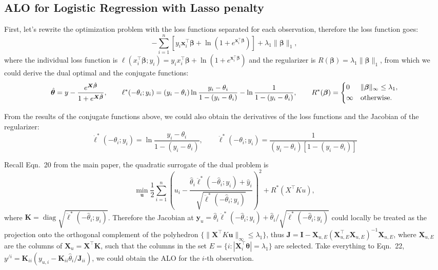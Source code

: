 \documentclass[11pt]{article}
\newcommand{\bu}{\bm{u}}
\newcommand{\bx}{\bm{x}}
\newcommand{\by}{\bm{y}}
\newcommand{\bI}{\bm{I}}
\newcommand{\bJ}{\bm{J}}
\newcommand{\bK}{\bm{K}}
\newcommand{\bX}{\bm{X}}
\newcommand{\bbeta}{\bm{\beta}}
\newcommand{\btheta}{\bm{\theta}}
\DeclareMathOperator{\diag}{diag}
\newcommand{\refthm}[2]{#1~#2}
\begin{document}
\subsection{ALO for Logistic Regression with Lasso penalty}
First, let's rewrite the optimization problem with the loss functions separated for each observation, therefore the loss function goes: \[-\sum_{i=1}^n\left[y_{i}\bx_{i}^{\top}\bbeta+\ln\left(1+e^{\bx_{i}^{\top}\bbeta}\right)\right]+\lambda_{1}\|\bbeta\|_{1},\]
where the individual loss function is $\ell(x_{i}^{\top}\bbeta ;y_{i}) = y_{i}x_{i}^{\top}\bbeta+\ln(1+e^{\bx_{i}^{\top}\bbeta})$ and the regularizer is $R(\bbeta) = \lambda_{1}\|\bbeta\|_{1}$, from which we could derive the dual optimal and the conjugate functions: \[\hat{\btheta} = y - \frac{e^{\bX\hat{\bbeta}}}{1+e^{\bX\hat{\bbeta}}},\qquad \ell^{*}(-\theta_{i};y_{i})=(y_{i}-\theta_{i})\ln\frac{y_{i}-\theta_{i}}{1-(y_{i}-\theta_{i})}-\ln\frac{1}{1-(y_{i}-\theta_{i})},\qquad R^{*}(\bbeta) =\begin{dcases}
0 & \|\bbeta\|_{\infty} \leq \lambda_{1},\\
\infty & \text{otherwise}.\\
\end{dcases}\]

From the results of the conjugate functions above, we could also obtain the derivatives of the loss functions and the Jacobian of the regularizer: \[\dot{\ell}^{*}(-\theta_{i};y_{i}) = \ln \frac{y_{i}-\theta_{i}}{1-(y_{i}-\theta_{i})},\qquad \ddot{\ell}^{*}(-\theta_{i};y_{i}) = \frac{1}{(y_{i}-\theta_{i})[1-(y_{i}-\theta_{i})]}\]

Recall \refthm{Eqn.}{20} from the main paper, the quadratic surrogate of the dual problem is \[\min\limits_{\bu} \frac{1}{2}\sum_{i=1}^n\left(u_{i}-\frac{\hat{\theta}_{i}\ddot{\ell}^{*}(-\hat{\theta}_{i};y_{i})+\hat{y}_{i}}{\sqrt{\ddot{\ell}^{*}(-\hat{\theta}_{i};y_{i})}}\right)^{2}+R^{*}(X^{\top}Ku),\] where $\bK=\diag\sqrt{\ddot{\ell}^{*}(-\hat{\theta}_{i};y_{i})}$. Therefore the Jacobian at $\by_{u} =\hat{\theta}_{i}\ddot{\ell}^{*}(-\hat{\theta}_{i};y_{i})+\hat{\theta}_{i}/\sqrt{\ddot{\ell}^{*}(-\hat{\theta}_{i};y_{i})}$ could locally be treated as the projection onto the orthogonal complement of the polyhedron $\{\|\bX^{\top}K\bu\|_{\infty} \leq \lambda_{1}\}$, thus $\bJ = \bI - \bX_{u,E}(\bX_{u,E}^{\top}\bX_{u,E})^{-1}\bX_{u,E}$, where $\bX_{u,E}$ are the columns of $\bX_{u}=\bX^{\top}\bK$, such that the columns in the set $E = \{i:|\bX_{i}^{\top}\btheta| = \lambda_{1}\}$ are selected. Take everything to \refthm{Eqn.}{22}, $y^{/i} = \bK_{ii}(y_{u,i}-\bK_{ii}\hat{\theta}_{i}/\bJ_{ii})$, we could obtain the ALO for the $i$-th observation.
\end{document}
